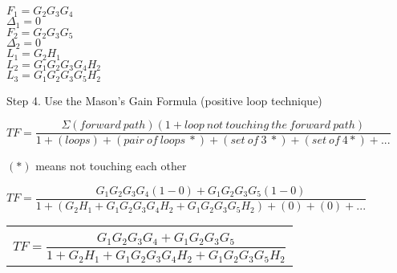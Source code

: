 \documentclass[11pt,letterpaper]{article}
\begin{document}
\begin{center}
\\[12pt]
    $F_1=G_2G_3G_4$\\[12pt]
	$\Delta_1=0$\\[15pt]
	$F_2=G_2G_3G_5$\\[12pt]
	$\Delta_2=0$\\
	$L_1=G_2H_1$\\[12pt]
	$L_2=G_1G_2G_3G_4H_2$\\[12pt]
	$L_3=G_1G_2G_3G_5H_2$\\[12pt]
\end{center}
Step 4. Use the Mason’s Gain Formula (positive loop technique)\\
\begin{center}
	$TF=\dfrac{\Sigma (forward~path)(1 + loop~not~touching~the~forward~path)}{1 + (loops) + (pair~of~loops~*) + (set~of~3~*) + (set~of~4*) + ...}$
\end{center}
$(*)$ means not touching each other\\
\begin{center}
	$TF=\dfrac{G_1G_2G_3G_4(1-0)+G_1G_2G_3G_5(1-0)}{1+(G_2H_1+G_1G_2G_3G_4H_2+G_1G_2G_3G_5H_2)+(0)+(0)+...}$\\[12pt]
	\begin{tabular}{|c|}
		\hline \\
	$TF=\dfrac{G_1G_2G_3G_4+G_1G_2G_3G_5}{1+G_2H_1+G_1G_2G_3G_4H_2+G_1G_2G_3G_5H_2}$\\[12pt]
	\hline
	\end{tabular}
\end{center}
\end{document}
